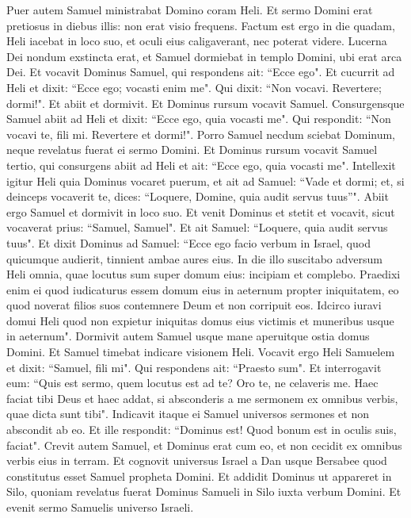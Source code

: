 \begin{biblechapter}  
\verse Puer autem Samuel ministrabat Domino coram Heli. Et sermo Domini erat pretiosus in diebus illis: non erat visio frequens. 
\verse Factum est ergo in die quadam, Heli iacebat in loco suo, et oculi eius caligaverant, nec poterat videre. 
\verse Lucerna Dei nondum exstincta erat, et Samuel dormiebat in templo Domini, ubi erat arca Dei. 
\verse Et vocavit Dominus Samuel, qui respondens ait: “Ecce ego". 
\verse Et cucurrit ad Heli et dixit: “Ecce ego; vocasti enim me". Qui dixit: “Non vocavi. Revertere; dormi!". Et abiit et dormivit. 
\verse Et Dominus rursum vocavit Samuel. Consurgensque Samuel abiit ad Heli et dixit: “Ecce ego, quia vocasti me". Qui respondit: “Non vocavi te, fili mi. Revertere et dormi!". 
\verse Porro Samuel necdum sciebat Dominum, neque revelatus fuerat ei sermo Domini. 
\verse Et Dominus rursum vocavit Samuel tertio, qui consurgens abiit ad Heli 
\verse et ait: “Ecce ego, quia vocasti me". Intellexit igitur Heli quia Dominus vocaret puerum, et ait ad Samuel: “Vade et dormi; et, si deinceps vocaverit te, dices: “Loquere, Domine, quia audit servus tuus”". Abiit ergo Samuel et dormivit in loco suo. 
\verse Et venit Dominus et stetit et vocavit, sicut vocaverat prius: “Samuel, Samuel". Et ait Samuel: “Loquere, quia audit servus tuus". 
\verse Et dixit Dominus ad Samuel: “Ecce ego facio verbum in Israel, quod quicumque audierit, tinnient ambae aures eius. 
\verse In die illo suscitabo adversum Heli omnia, quae locutus sum super domum eius: incipiam et complebo. 
\verse Praedixi enim ei quod iudicaturus essem domum eius in aeternum propter iniquitatem, eo quod noverat filios suos contemnere Deum et non corripuit eos. 
\verse Idcirco iuravi domui Heli quod non expietur iniquitas domus eius victimis et muneribus usque in aeternum". 
\verse Dormivit autem Samuel usque mane aperuitque ostia domus Domini. Et Samuel timebat indicare visionem Heli. 
\verse Vocavit ergo Heli Samuelem et dixit: “Samuel, fili mi". Qui respondens ait: “Praesto sum". 
\verse Et interrogavit eum: “Quis est sermo, quem locutus est ad te? Oro te, ne celaveris me. Haec faciat tibi Deus et haec addat, si absconderis a me sermonem ex omnibus verbis, quae dicta sunt tibi". 
\verse Indicavit itaque ei Samuel universos sermones et non abscondit ab eo. Et ille respondit: “Dominus est! Quod bonum est in oculis suis, faciat". 
\verse Crevit autem Samuel, et Dominus erat cum eo, et non cecidit ex omnibus verbis eius in terram. 
\verse Et cognovit universus Israel a Dan usque Bersabee quod constitutus esset Samuel propheta Domini. 
\verse Et addidit Dominus ut appareret in Silo, quoniam revelatus fuerat Dominus Samueli in Silo iuxta verbum Domini. Et evenit sermo Samuelis universo Israeli. 
\end{biblechapter}

